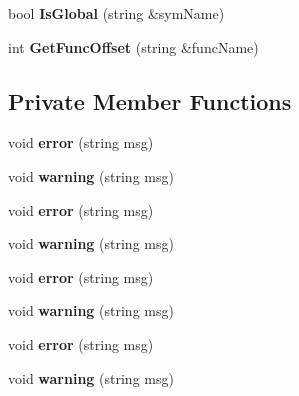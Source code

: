 \begin{DoxyCompactItemize}
\item 
\hypertarget{classSymTab_a4c4699d90ffd605b205e9e94be9eacde}{bool {\bfseries Is\-Global} (string \&sym\-Name)}\label{classSymTab_a4c4699d90ffd605b205e9e94be9eacde}

\item 
\hypertarget{classSymTab_a793c31d247f484b04a9283e71f172756}{int {\bfseries Get\-Func\-Offset} (string \&func\-Name)}\label{classSymTab_a793c31d247f484b04a9283e71f172756}

\end{DoxyCompactItemize}
\subsection*{Private Member Functions}
\begin{DoxyCompactItemize}
\item 
\hypertarget{classSymTab_aac2487968008aeee1b1e2490092c6b8b}{void {\bfseries error} (string msg)}\label{classSymTab_aac2487968008aeee1b1e2490092c6b8b}

\item 
\hypertarget{classSymTab_ae92d574f1857924058d55b69cb146af3}{void {\bfseries warning} (string msg)}\label{classSymTab_ae92d574f1857924058d55b69cb146af3}

\item 
\hypertarget{classSymTab_aac2487968008aeee1b1e2490092c6b8b}{void {\bfseries error} (string msg)}\label{classSymTab_aac2487968008aeee1b1e2490092c6b8b}

\item 
\hypertarget{classSymTab_ae92d574f1857924058d55b69cb146af3}{void {\bfseries warning} (string msg)}\label{classSymTab_ae92d574f1857924058d55b69cb146af3}

\item 
\hypertarget{classSymTab_aac2487968008aeee1b1e2490092c6b8b}{void {\bfseries error} (string msg)}\label{classSymTab_aac2487968008aeee1b1e2490092c6b8b}

\item 
\hypertarget{classSymTab_ae92d574f1857924058d55b69cb146af3}{void {\bfseries warning} (string msg)}\label{classSymTab_ae92d574f1857924058d55b69cb146af3}

\item 
\hypertarget{classSymTab_aac2487968008aeee1b1e2490092c6b8b}{void {\bfseries error} (string msg)}\label{classSymTab_aac2487968008aeee1b1e2490092c6b8b}

\item 
\hypertarget{classSymTab_ae92d574f1857924058d55b69cb146af3}{void {\bfseries warning} (string msg)}\label{classSymTab_ae92d574f1857924058d55b69cb146af3}


\end{DoxyCompactItemize}
